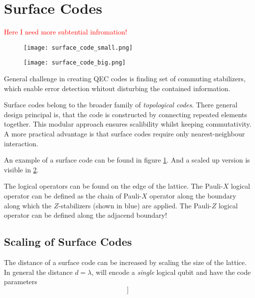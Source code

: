 \section{Surface Codes}
\textcolor{red}{Here I need more subtential infromation!}
\begin{figure}[h]
    \begin{center}
        \texttt{[image: surface\_code\_small.png]}
    \end{center}
    \label{fig:basic.qc.surface_code_small}
\end{figure}
\begin{figure}[h]
    \begin{center}
        \texttt{[image: surface\_code\_big.png]}
    \end{center}
    \label{fig:basic.qc.surface_code_big}
\end{figure}
General challenge in creating QEC codes is finding set of commuting stabilizers, 
which enable error detection whitout disturbing the contained information.

Surface codes belong to the broader family of \textit{topological codes}.
There general design principal is, that the code is constructed by connecting repeated elements together. 
This modular approach ensures scalibility whilst keeping commutativity.
A more practical advantage is that surface codes require only nearest-neighbour interaction. \cite{QECintro}

An example of a surface code can be found in figure \ref{fig:basic.qc.surface_code_small}.
And a scaled up version is visible in \ref{fig:basic.qc.surface_code_big}. \cite{QECintro}

The logical operators can be found on the edge of the lattice. 
The Pauli-$X$ logical operator can be defined as the chain of Pauli-$X$ operator along the boundary along which the $Z$-stabilizers (shown in blue) are applied.
The Pauli-$Z$ logical operator can be defined along the adjacend boundary! \cite{QECintro}


\subsection{Scaling of Surface Codes}
The distance of a surface code can be increased by scaling the size of the lattice.
In general the distance $d=\lambda$, will encode a \textit{single} logical qubit and have the code parameters \cite{QECintro}
\begin{equation}
    [[n = \lambda^2 + (\lambda-1)^2, k=1 ]]
\end{equation}
